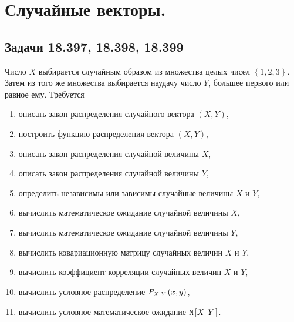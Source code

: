 \chapter{Случайные векторы.}

\section*{Задачи 18.397, 18.398, 18.399}

Число $X$ выбирается случайным образом из множества целых чисел $\left \{ 1, 2, 3 \right \}$. Затем из того же множества выбирается наудачу число $Y$, большее первого
или равное ему. Требуется
\begin{enumerate}
    \item описать закон распределения случайного вектора $\left ( X, Y \right )$,
    \item построить функцию распределения вектора $(X, Y)$,
    \item описать закон распределения случайной величины $X$,
    \item описать закон распределения случайной величины $Y$,
    \item определить независимы или зависимы случайные величины $X$ и $Y$,
    \item вычислить математическое ожидание случайной величины $X$,
    \item вычислить математическое ожидание случайной величины $Y$,
    \item вычислить ковариационную матрицу случайных величин $X$ и $Y$,
    \item вычислить коэффициент корреляции случайных величин $X$ и $Y$,
    \item вычислить условное распределение $P_{X \left | Y \right .}(x,y)$,
    \item вычислить условное математическое ожидание $\mathtt{M} \left [ X \left | Y \right . \right ]$.
\end{enumerate}

